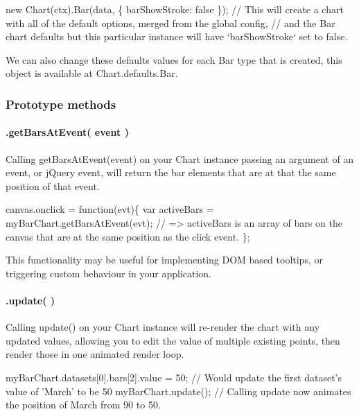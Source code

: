 \begin{DoxyCode}
new Chart(ctx).Bar(data, \{
    barShowStroke: false
\});
// This will create a chart with all of the default options, merged from the global config,
//  and the Bar chart defaults but this particular instance will have `barShowStroke` set to false.
\end{DoxyCode}


We can also change these defaults values for each Bar type that is created, this object is available at {\ttfamily Chart.\+defaults.\+Bar}.

\subsubsection*{Prototype methods}

\paragraph*{.get\+Bars\+At\+Event( event )}

Calling {\ttfamily get\+Bars\+At\+Event(event)} on your Chart instance passing an argument of an event, or j\+Query event, will return the bar elements that are at that the same position of that event.


\begin{DoxyCode}
canvas.onclick = function(evt)\{
    var activeBars = myBarChart.getBarsAtEvent(evt);
    // => activeBars is an array of bars on the canvas that are at the same position as the click event.
\};
\end{DoxyCode}


This functionality may be useful for implementing D\+OM based tooltips, or triggering custom behaviour in your application.

\paragraph*{.update( )}

Calling {\ttfamily update()} on your Chart instance will re-\/render the chart with any updated values, allowing you to edit the value of multiple existing points, then render those in one animated render loop.


\begin{DoxyCode}
myBarChart.datasets[0].bars[2].value = 50;
// Would update the first dataset's value of 'March' to be 50
myBarChart.update();
// Calling update now animates the position of March from 90 to 50.
\end{DoxyCode}


